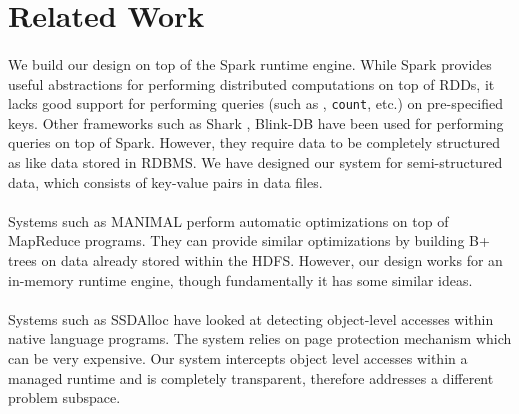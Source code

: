 \section{Related Work}
\label{sec:related}
\paragraph{}
We build our design on top of the Spark \cite{zaharia2012resilient}
runtime engine. While Spark provides useful abstractions for performing
distributed computations on top of RDDs, it lacks good support for
performing queries (such as , \texttt{count}, etc.) on
pre-specified keys.  Other frameworks such as Shark
\cite{engle2012shark}, Blink-DB \cite{agarwal2013blinkdb} have been used
for performing queries on top of Spark. However, they require data to be
completely structured as like data stored in RDBMS. We have designed our
system for semi-structured data, which consists of key-value pairs in
data files. 

\paragraph{}
Systems such as MANIMAL \cite{jahani2011automatic} perform automatic
optimizations on top of MapReduce programs. They can provide similar
optimizations by building B+ trees on data already stored within the
HDFS. However, our design works for an in-memory runtime engine, though
fundamentally it has some similar ideas.

\paragraph{}
Systems such as SSDAlloc\cite{badam2011ssdalloc} have looked at
detecting object-level accesses within native language programs. The
system relies on page protection mechanism which can be very expensive.
Our system intercepts object level accesses within a managed runtime and
is completely transparent, therefore addresses a different problem
subspace.
